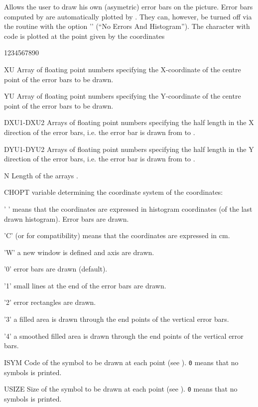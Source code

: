 \Action
Allows the user to draw his own (asymetric) error bars on the picture. Error
bars computed by \HBOOK{} are automatically plotted by \HPLOT. They can,
however, be turned off via the routine  with the option
'' (``No Errors And Histogram''). The character with code 
is plotted at the point given by the coordinates 
\Pdesc
\begin{DLtt}{1234567890}
\item[XU]        Array of floating point numbers specifying the X-coordinate of
                 the centre point of the error bars to be drawn.
\item[YU]        Array of floating point numbers specifying the Y-coordinate of
                 the centre point of the error bars to be drawn.
\item[DXU1-DXU2] Arrays of floating point numbers specifying the half length
                 in the X direction of the error bars, i.e. the error bar is
                 drawn from  to .
\item[DYU1-DYU2] Arrays of floating point numbers specifying the half length
                 in the Y direction of the error bars, i.e. the error bar is
                 drawn from  to .
\item[N]         Length of the arrays .
\item[CHOPT]     \CHARACTER{} variable determining the coordinate system of the
                  coordinates:
\begin{DLtt}{12}
  \item[' '] means that the coordinates are expressed in histogram coordinates
             (of the last drawn histogram). Error bars are drawn.
  \item['C'] (or  for compatibility) means that the coordinates are
             expressed in cm.
  \item['W'] a new window is defined and axis are drawn.
  \item['0'] error bars are drawn (default).
  \item['1'] small lines at the end of the error bars are drawn.
  \item['2'] error rectangles are drawn.
  \item['3'] a filled area is drawn through the end points of the vertical 
             error bars.
  \item['4'] a smoothed filled area is drawn through the end points of the 
             vertical error bars.
\end{DLtt}
\item[ISYM]  Code of the symbol to be drawn at each point (see ).
             {\tt0} means that no symbols is printed.
\item[USIZE] Size of the symbol to be drawn at each point (see ).
             {\tt0} means that no symbols is printed.
\end{DLtt}
